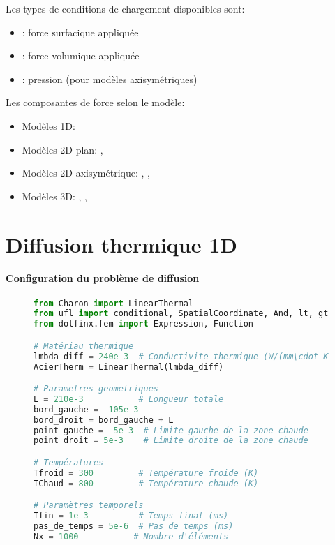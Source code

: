 \documentclass[10pt]{book}
\begin{document}
Les types de conditions de chargement disponibles sont:
\begin{itemize}
\item {}: force surfacique appliquée
\item {}: force volumique appliquée
\item {}: pression (pour modèles axisymétriques)
\end{itemize}

Les composantes de force selon le modèle:
\begin{itemize}
\item Modèles 1D: 
\item Modèles 2D plan: , 
\item Modèles 2D axisymétrique: , , 
\item Modèles 3D: , , 
\end{itemize}

\clearpage

\section{Diffusion thermique 1D}\label{Section:Diffusion thermique 1D}

\paragraph{Configuration du problème de diffusion}

\begin{figure}[h!]
\begin{lstlisting}[language=python]
from Charon import LinearThermal
from ufl import conditional, SpatialCoordinate, And, lt, gt
from dolfinx.fem import Expression, Function

# Matériau thermique
lmbda_diff = 240e-3  # Conductivite thermique (W/(mm\cdot K))
AcierTherm = LinearThermal(lmbda_diff)

# Parametres geometriques
L = 210e-3           # Longueur totale
bord_gauche = -105e-3
bord_droit = bord_gauche + L
point_gauche = -5e-3  # Limite gauche de la zone chaude
point_droit = 5e-3    # Limite droite de la zone chaude

# Températures
Tfroid = 300         # Température froide (K)
TChaud = 800         # Température chaude (K)

# Paramètres temporels
Tfin = 1e-3          # Temps final (ms)
pas_de_temps = 5e-6  # Pas de temps (ms)
Nx = 1000           # Nombre d'éléments
\end{lstlisting}
\end{figure}
\end{document}
